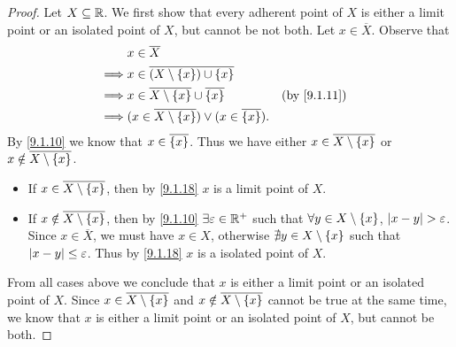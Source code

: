 \begin{proof}
	Let \(X \subseteq \mathbb{R}\).
	We first show that every adherent point of \(X\) is either a limit point or an isolated point of \(X\), but cannot be not both.
	Let \(x \in \overline{X}\).
	Observe that
	\begin{align*}
		         & x \in \overline{X}                                                                       \\
		\implies & x \in \overline{(X \setminus \set{x}) \cup \set{x}}                                      \\
		\implies & x \in \overline{X \setminus \set{x}} \cup \overline{\set{x}}            &  & \by{9.1.11} \\
		\implies & (x \in \overline{X \setminus \set{x}}) \lor (x \in \overline{\set{x}}).
	\end{align*}
	By \cref{9.1.10} we know that \(x \in \overline{\left\lbrace x\right\rbrace}\).
	Thus we have either \(x \in \overline{X \setminus \left\lbrace x\right\rbrace}\) or \(x \notin \overline{X \setminus \left\lbrace x\right\rbrace}\).
	\begin{itemize}
		\item If \(x \in \overline{X \setminus \left\lbrace x\right\rbrace}\), then by \cref{9.1.18} \(x\) is a limit point of \(X\).
		\item If \(x \notin \overline{X \setminus \left\lbrace x\right\rbrace}\), then by \cref{9.1.10} \(\exists \varepsilon \in \mathbb{R}^+\) such that \(\forall y \in X \setminus \left\lbrace x\right\rbrace\), \(\left\lvert x - y\right\rvert > \varepsilon\).
		      Since \(x \in \overline{X}\), we must have \(x \in X\), otherwise \(\nexists y \in X \setminus \left\lbrace x\right\rbrace\) such that \(\left\lvert x - y\right\rvert \leq \varepsilon\).
		      Thus by \cref{9.1.18} \(x\) is a isolated point of \(X\).
	\end{itemize}
	From all cases above we conclude that \(x\) is either a limit point or an isolated point of \(X\).
	Since \(x \in \overline{X \setminus \left\lbrace x\right\rbrace}\) and \(x \notin \overline{X \setminus \left\lbrace x\right\rbrace}\) cannot be true at the same time, we know that \(x\) is either a limit point or an isolated point of \(X\), but cannot be both.


\end{proof}
